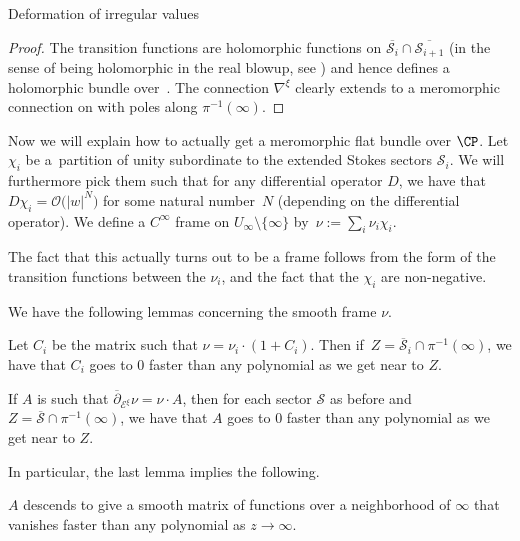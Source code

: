 \begin{subsubsection}{Deformation of irregular values}
\begin{Proposition}
\begin{proof}
The transition functions are holomorphic functions on $\overline{\mathcal{S}_i}\cap \overline{\mathcal{S}_{i+1}}$ (in the sense of being holomorphic in the real blowup, see \cite[Section 3.1.3]{M}) and hence defines a holomorphic bundle over~\smash{$\widetilde{\CP}(\infty)$}. The connection $\nabla^{\xi}$ clearly extends to a meromorphic connection on \smash{$\widetilde{\CP}(\infty)$} with poles along $\pi^{-1}(\infty)$.
\end{proof}

\end{Proposition}

Now we will explain how to actually get a meromorphic flat bundle over $\CP$. Let $\chi_{i}$ be a~partition of unity subordinate to the extended Stokes sectors $\mathcal{S}_i$. We will furthermore pick them such that for any differential operator $D$, we have that $D\chi_{i}=\mathcal{O}\bigl(|w|^{N}\bigr)$ for some natural number~$N$ (depending on the differential operator). We define a $C^{\infty}$ frame on $U_{\infty}\setminus \{\infty\}$ by~$
 \nu:=\sum_i \nu_{i}\chi_{i}$.

The fact that this actually turns out to be a frame follows from the form of the transition functions between the $\nu_{i}$, and the fact that the $\chi_{i}$ are non-negative.

We have the following lemmas concerning the smooth frame $\nu$.

\begin{Lemma}[{\cite[Lemma 3.1.15]{M}}] Let $C_i$ be the matrix such that $\nu=\nu_i\cdot(1+C_i)$. Then if~$Z=\overline{\mathcal{S}}_i\cap \pi^{-1}(\infty)$, we have that $C_i$ goes to $0$ faster than any polynomial as we get near to $Z$.

\end{Lemma}

\begin{Lemma}[{\cite[Lemma 3.1.16]{M}}] If $A$ is such that $\overline{\partial}_{\mathcal{E}^{\xi}}\nu=\nu \cdot A$, then for each sector $\mathcal{S}$ as before and $Z=\overline{\mathcal{S}}\cap \pi^{-1}(\infty)$, we have that $A$ goes to $0$ faster than any polynomial as we get near to $Z$.

\end{Lemma}
In particular, the last lemma implies the following.

\begin{Corollary}\label{exthol}
$A$ descends to give a smooth matrix of functions over a neighborhood of $\infty$ that vanishes faster than any polynomial as $z\to \infty$.
\end{Corollary}


\end{subsubsection}
